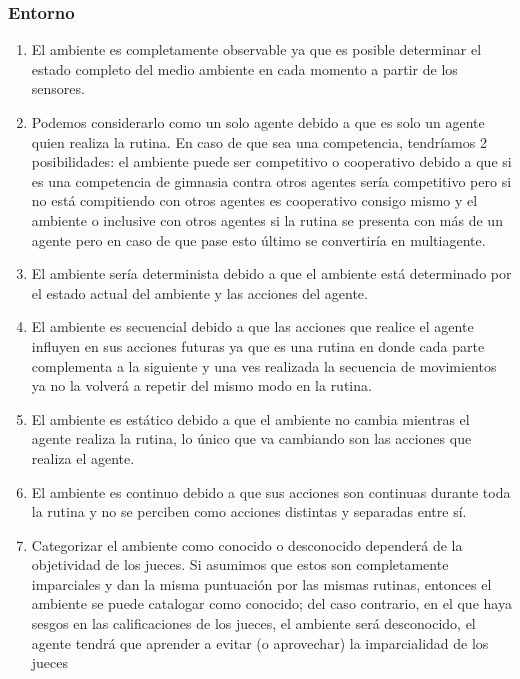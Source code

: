 \documentclass{article}
\begin{document}
            \subsubsection{Entorno}
                \begin{enumerate}
                    \item El ambiente es completamente observable ya que es posible determinar el estado completo del medio ambiente en cada momento a partir de los sensores.
                    \item Podemos considerarlo como un solo agente debido a que es solo un agente quien realiza la rutina. En caso de que sea una competencia, tendríamos 2 posibilidades: el ambiente puede ser competitivo o cooperativo debido a que si es una competencia de gimnasia contra otros agentes sería competitivo pero si no está compitiendo con otros agentes es cooperativo consigo mismo y el ambiente o inclusive con otros agentes si la rutina se presenta con más de un agente pero en caso de que pase esto último se convertiría en multiagente.
                    \item El ambiente sería determinista debido a que el ambiente está determinado por el estado actual del ambiente y las acciones del agente.
                    \item El ambiente es secuencial debido a que las acciones que realice el agente influyen en sus acciones futuras ya que es una rutina en donde cada parte complementa a la siguiente y una ves realizada la secuencia de movimientos ya no la volverá a repetir del mismo modo en la rutina.
                    \item El ambiente es estático debido a que el ambiente no cambia mientras el agente realiza la rutina, lo único que va cambiando son las acciones que realiza el agente.
                    \item El ambiente es continuo debido a que sus acciones son continuas durante toda la rutina y no se perciben como acciones distintas y separadas entre sí.
                    \item Categorizar el ambiente como conocido o desconocido dependerá de la objetividad de los jueces. Si asumimos que estos son completamente imparciales y dan la misma puntuación por las mismas rutinas, entonces el ambiente se puede catalogar como conocido; del caso contrario, en el que haya sesgos en las calificaciones de los jueces, el ambiente será desconocido, el agente tendrá que aprender a evitar (o aprovechar) la imparcialidad de los jueces
                \end{enumerate}
\end{document}
